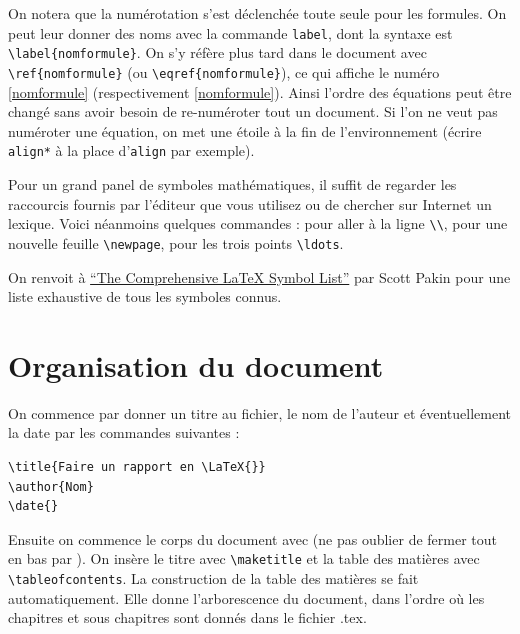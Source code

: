 \begin{rem}
On notera que la numérotation s'est déclenchée toute seule pour les formules. 
On peut  leur donner des noms avec la commande \lstinline+label+,  dont la syntaxe est  \lstinline+\label{nomformule}+.  
On s'y réfère plus tard dans le document avec \lstinline+\ref{nomformule}+ (ou \lstinline+\eqref{nomformule}+), ce qui affiche
le num\'ero \ref{nomformule} (respectivement \eqref{nomformule}). 
Ainsi l'ordre des équations peut être changé sans avoir besoin de re-numéroter tout un document. 
Si l'on ne veut pas numéroter une équation,  on met une étoile à la fin de l'environnement 
(écrire \lstinline+align*+ à la place d'\lstinline+align+ par exemple).
\end{rem}



Pour un grand panel de symboles mathématiques, il suffit de regarder les raccourcis fournis par l'éditeur 
que vous utilisez ou de chercher sur Internet un lexique. Voici néanmoins quelques commandes : 
pour aller à la ligne  \lstinline+\\+, 
pour une nouvelle feuille \lstinline+\newpage+, pour les trois points  \lstinline+\ldots+.

On renvoit à \href{http://www.tex.ac.uk/tex-archive/info/symbols/comprehensive/symbols-a4.pdf}
{``The Comprehensive \LaTeX{} Symbol List''} par Scott Pakin pour une liste exhaustive de tous les
 symboles connus.


\section{Organisation du document}


On commence par donner un titre au  fichier, le nom de l'auteur et éventuellement la date par les
 commandes suivantes :\medskip

\begin{lstlisting}
\title{Faire un rapport en \LaTeX{}} 
\author{Nom} 
\date{}
\end{lstlisting}



Ensuite on commence le corps du document avec \lstinline++ 
(ne pas oublier de fermer tout en bas par \lstinline++). 
On insère le titre avec \lstinline+\maketitle+ et la table des matières avec \lstinline+\tableofcontents+.
La construction de la table des matières se fait automatiquement. 
Elle donne l'arborescence du document, dans l'ordre où les chapitres et sous chapitres sont donnés 
dans le fichier .tex.\medskip	


